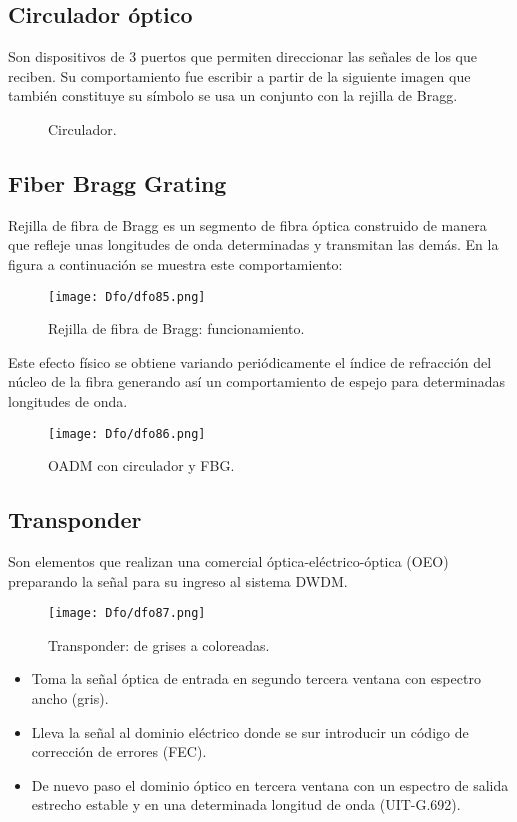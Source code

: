 \documentclass[
	12pt, %
	fleqn, %
	a4paper, %
	oneside, %
]{LegrandOrangeBook}
\begin{document}
\subsection{Circulador óptico}
Son dispositivos de 3 puertos que permiten direccionar las señales de los que reciben. Su comportamiento fue escribir a partir de la siguiente imagen que también constituye su símbolo se usa un conjunto con la rejilla de Bragg.
\begin{figure}[H]
\centering
{}
\caption{Circulador.}
\end{figure}
\subsection{Fiber Bragg Grating}
Rejilla de fibra de Bragg es un segmento de fibra óptica construido de manera que refleje unas longitudes de onda determinadas y transmitan las demás. En la figura a continuación se muestra este comportamiento:
\begin{figure}[H]
\centering
\texttt{[image: Dfo/dfo85.png]}
\caption{Rejilla de fibra de Bragg: funcionamiento.}
\end{figure}
Este efecto físico se obtiene variando periódicamente el índice de refracción del núcleo de la fibra generando así un comportamiento de espejo para determinadas longitudes de onda.
\begin{figure}[H]
\centering
\texttt{[image: Dfo/dfo86.png]}
\caption{OADM con circulador y FBG.}
\end{figure}
\subsection{Transponder}
Son elementos que realizan una comercial óptica-eléctrico-óptica (OEO) preparando la señal para su ingreso al sistema DWDM.
\begin{figure}[H]
\centering
\texttt{[image: Dfo/dfo87.png]}
\caption{Transponder: de grises a coloreadas.}
\end{figure}
\begin{itemize}
\item Toma la señal óptica de entrada en segundo tercera ventana con espectro ancho (gris).
\item Lleva la señal al dominio eléctrico donde se sur introducir un código de corrección de errores (FEC).
\item De nuevo paso el dominio óptico en tercera ventana con un espectro de salida estrecho estable y en una determinada longitud de onda (UIT-G.692). 
\end{itemize}
\end{document}
